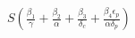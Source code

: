 \documentclass[preview]{standalone}
\begin{document}
\begin{center}
$S ( \frac{\beta_1}{\gamma} + \frac{\beta_2}{\alpha} + \frac{\beta_3}{\delta_c} + \frac{\beta_4 \epsilon_p}{\alpha \delta_p} )$
\end{center}
\end{document}
